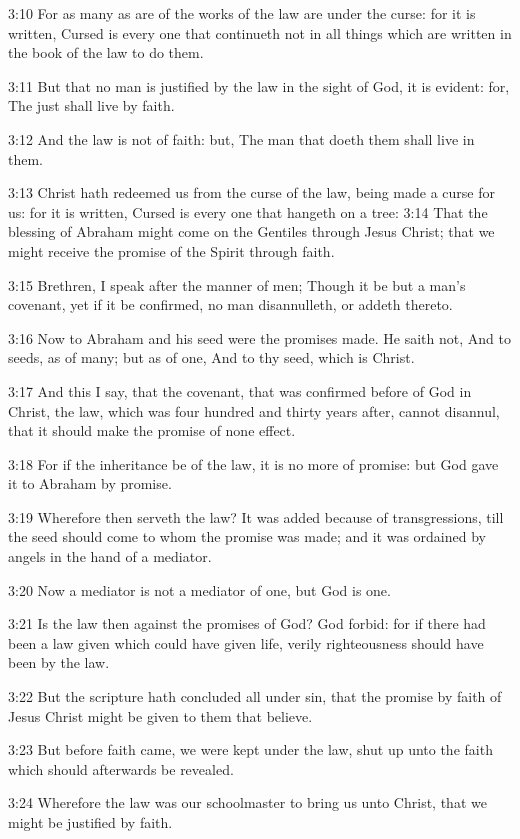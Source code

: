 3:10 For as many as are of the works of the law are under the curse:
for it is written, Cursed is every one that continueth not in all
things which are written in the book of the law to do them.

3:11 But that no man is justified by the law in the sight of God, it
is evident: for, The just shall live by faith.

3:12 And the law is not of faith: but, The man that doeth them shall
live in them.

3:13 Christ hath redeemed us from the curse of the law, being made a
curse for us: for it is written, Cursed is every one that hangeth on a
tree: 3:14 That the blessing of Abraham might come on the Gentiles
through Jesus Christ; that we might receive the promise of the Spirit
through faith.

3:15 Brethren, I speak after the manner of men; Though it be but a
man's covenant, yet if it be confirmed, no man disannulleth, or addeth
thereto.

3:16 Now to Abraham and his seed were the promises made. He saith not,
And to seeds, as of many; but as of one, And to thy seed, which is
Christ.

3:17 And this I say, that the covenant, that was confirmed before of
God in Christ, the law, which was four hundred and thirty years after,
cannot disannul, that it should make the promise of none effect.

3:18 For if the inheritance be of the law, it is no more of promise:
but God gave it to Abraham by promise.

3:19 Wherefore then serveth the law? It was added because of
transgressions, till the seed should come to whom the promise was
made; and it was ordained by angels in the hand of a mediator.

3:20 Now a mediator is not a mediator of one, but God is one.

3:21 Is the law then against the promises of God? God forbid: for if
there had been a law given which could have given life, verily
righteousness should have been by the law.

3:22 But the scripture hath concluded all under sin, that the promise
by faith of Jesus Christ might be given to them that believe.

3:23 But before faith came, we were kept under the law, shut up unto
the faith which should afterwards be revealed.

3:24 Wherefore the law was our schoolmaster to bring us unto Christ,
that we might be justified by faith.

